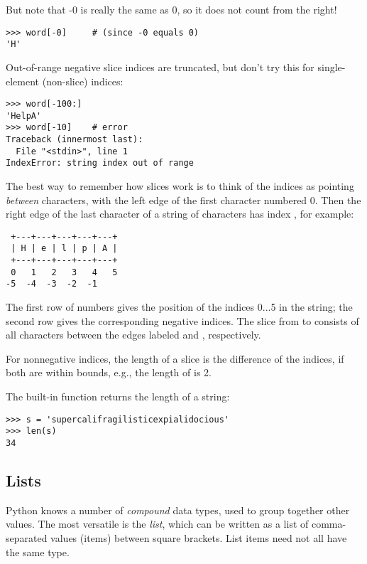 \documentclass{manual}
\begin{document}
But note that -0 is really the same as 0, so it does not count from
the right!

\begin{verbatim}
>>> word[-0]     # (since -0 equals 0)
'H'
\end{verbatim}

Out-of-range negative slice indices are truncated, but don't try this
for single-element (non-slice) indices:

\begin{verbatim}
>>> word[-100:]
'HelpA'
>>> word[-10]    # error
Traceback (innermost last):
  File "<stdin>", line 1
IndexError: string index out of range
\end{verbatim}

The best way to remember how slices work is to think of the indices as
pointing \emph{between} characters, with the left edge of the first
character numbered 0.  Then the right edge of the last character of a
string of  characters has index , for example:

\begin{verbatim}
 +---+---+---+---+---+ 
 | H | e | l | p | A |
 +---+---+---+---+---+ 
 0   1   2   3   4   5 
-5  -4  -3  -2  -1
\end{verbatim}

The first row of numbers gives the position of the indices 0...5 in
the string; the second row gives the corresponding negative indices.
The slice from  to  consists of all characters between
the edges labeled  and , respectively.

For nonnegative indices, the length of a slice is the difference of
the indices, if both are within bounds, e.g., the length of
 is 2.

The built-in function  returns the length of a string:

\begin{verbatim}
>>> s = 'supercalifragilisticexpialidocious'
>>> len(s)
34
\end{verbatim}

\subsection{Lists \label{lists}}

Python knows a number of \emph{compound} data types, used to group
together other values.  The most versatile is the \emph{list}, which
can be written as a list of comma-separated values (items) between
square brackets.  List items need not all have the same type.
\end{document}

